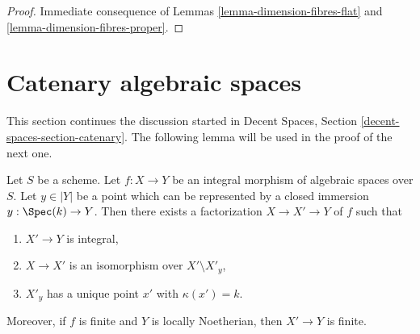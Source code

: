 \begin{proof}
Immediate consequence of
Lemmas \ref{lemma-dimension-fibres-flat} and
\ref{lemma-dimension-fibres-proper}.
\end{proof}





\section{Catenary algebraic spaces}
\label{section-catenary}

\noindent
This section continues the discussion started in
Decent Spaces, Section \ref{decent-spaces-section-catenary}.
The following lemma will be used in the proof of the next one.

\begin{lemma}
\label{lemma-construct-glueing}
Let $S$ be a scheme. Let $f : X \to Y$ be an integral morphism
of algebraic spaces over $S$.
Let $y \in |Y|$ be a point which can be represented by a closed immersion
$y : \Spec(k) \to Y$. Then there exists
a factorization $X \to X' \to Y$ of $f$ such that
\begin{enumerate}
\item $X' \to Y$ is integral,
\item $X \to X'$ is an isomorphism over $X' \setminus X'_y$,
\item $X'_y$ has a unique point $x'$ with $\kappa(x') = k$.
\end{enumerate}
Moreover, if $f$ is finite and $Y$ is locally Noetherian, then
$X' \to Y$ is finite.
\end{lemma}

